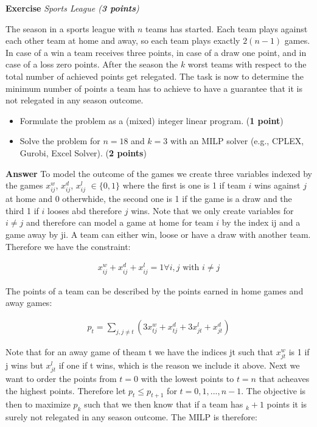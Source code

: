 \documentclass[a4paper,10pt]{article}
\newcounter{exc}
\newenvironment{exercise}[1]%
{\refstepcounter{exc}\textbf{Exercise \arabic{exc}} \emph{#1}\\}
{

\hrulefill\medskip}%
\begin{document}
\begin{exercise}{Sports League (\textbf{3 points})}\label{ex:sl}

The season in a sports league with $n$ teams has started. Each team plays against each other team at home and away, so each team plays exactly $2(n-1)$ games. In case of a win a team receives three points, in case of a draw one point, and in case of a loss zero points. After the season the $k$ worst teams with respect to the total number of achieved points get relegated. The task is now to determine the minimum number of points a team has to achieve to have a guarantee that it is not relegated in any season outcome. 
\begin{itemize}
 \item Formulate the problem as a (mixed) integer linear program. (\textbf{1 point})
 \item Solve the problem for $n=18$ and $k=3$ with an MILP solver (e.g., CPLEX, Gurobi, Excel Solver). (\textbf{2 points})
\end{itemize}
  \textbf{Answer}
  To model the outcome of the games we create three variables indexed by the games $x^w_{ij}$, $x^d_{ij}$, $x^l_{ij}$ $\in\{0,1\}$ where the first is one is 1 if team $i$ wins against $j$ at home and 0 otherwhide, the second one is 1 if the game is a draw and the third 1 if $i$ looses abd therefore $j$ wins. Note that we only create variables for $i\neq j$ and therefore can model a game at home for team $i$ by the index ij and a game away by ji. A team can either win, loose or have a draw with another team. Therefore we have the constraint:

\begin{align}
  x^w_{ij}+ x^d_{ij}+ x^l_{ij} = 1 \forall i,j \text{ with } i \neq j
\end{align}

The points of a team can be described by the points earned in home games and away games:

\begin{align}
  p_t = \sum_{j,j\neq t} (3x^w_{tj}+ x^d_{tj} + 3x^l_{jt}+ x^d_{jt})
\end{align}

Note that for an away game of theam t we have the indices jt such that $x^w_{jt}$ is 1 if j wins but $x^l_{jt}$ if one if t wins, which is the reason we include it above.
  Next we want to order the points from $t=0$ with the lowest points to $t=n$ that acheaves the highest points. Therefore let $p_t \leq p_{t+1}$ for $t=0,1,...,n-1$. The objective is then to maximize $p_k$ such that we then know that if a team has $_k+1$ points it is surely not relegated in any season outcome.   
The MILP is therefore:


\end{exercise}
\end{document}
